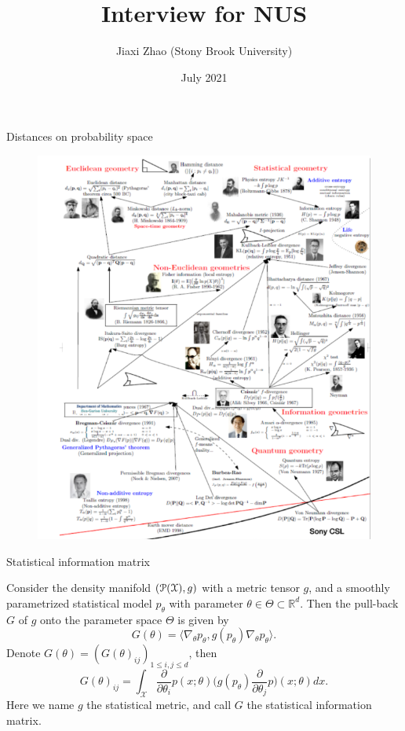 \documentclass{beamer}
\title[Interview for NUS]{Interview for NUS}
\author{Jiaxi Zhao (Stony Brook University)}
\institute[]{}
\date{July 2021}
\begin{document}
\par \setlength{\parindent}{2em}

\begin{frame}
\titlepage
\end{frame}


\begin{frame}{Distances on probability space}
    \begin{figure}[H]
          \centering
          \centerline{\includegraphics[width=0.6\linewidth]{history.png}}
        \end{figure}
\end{frame}


\begin{frame}{Statistical information matrix}

    \begin{definition}
	Consider the density manifold $(\mathcal{P}(\mathcal{X}), g)$ with a metric tensor $g$, and a smoothly parametrized statistical model $ p_\theta$ with parameter $\theta\in\Theta \subset \mathbb{R}^d$. 
	Then the pull-back $G$ of $g$ onto the parameter space $\Theta$ is given by
	\begin{equation*}
	G(\theta)=\Big\langle \nabla_\theta p_\theta, g( p_\theta) \nabla_\theta p_\theta\Big\rangle.
	\end{equation*}
Denote $G(\theta)=(G(\theta)_{ij})_{1\leq i,j\leq d}$, then 
\begin{equation*}
G(\theta)_{ij}=\int_{\mathcal{X}}{\frac{\partial}{\partial \theta_i}p(x;\theta)\Big(g(p_\theta)\frac{\partial}{\partial \theta_j}p\Big)(x;\theta)}dx.
\end{equation*}
Here we name $g$ the statistical metric, and call $G$ the statistical information matrix.
\end{definition}
\end{frame}
\end{document}

